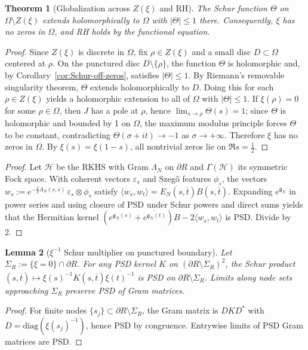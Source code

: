 \documentclass[11pt]{article}
\newtheorem{theorem}{Theorem}
\newtheorem{lemma}[theorem]{Lemma}
\theoremstyle{remark}
\begin{document}
\begin{theorem}[Globalization across \(Z(\xi)\) and RH]\label{thm:globalize-RH}
The Schur function \(\Theta\) on \(\Omega\setminus Z(\xi)\) extends holomorphically to \(\Omega\) with \(|\Theta|\le 1\) there. Consequently, \(\xi\) has no zeros in \(\Omega\), and RH holds by the functional equation.
\end{theorem}
\begin{proof}
Since \(Z(\xi)\) is discrete in \(\Omega\), fix \(\rho\in Z(\xi)\) and a small disc \(D\subset\Omega\) centered at \(\rho\). On the punctured disc \(D\setminus\{\rho\}\), the function \(\Theta\) is holomorphic and, by Corollary~\ref{cor:Schur-off-zeros}, satisfies \(|\Theta|\le 1\). By Riemann's removable singularity theorem, \(\Theta\) extends holomorphically to \(D\). Doing this for each \(\rho\in Z(\xi)\) yields a holomorphic extension to all of \(\Omega\) with \(|\Theta|\le 1\). If \(\xi(\rho)=0\) for some \(\rho\in\Omega\), then \(J\) has a pole at \(\rho\), hence \(\lim_{s\to\rho}\Theta(s)=1\); since \(\Theta\) is holomorphic and bounded by 1 on \(\Omega\), the maximum modulus principle forces \(\Theta\) to be constant, contradicting \(\Theta(\sigma+it)\to -1\) as \(\sigma\to+\infty\). Therefore \(\xi\) has no zeros in \(\Omega\). By \(\xi(s)=\xi(1-s)\), all nontrivial zeros lie on \(\Re s=\tfrac12\).
\end{proof}
\begin{proof}
Let \(\mathcal H\) be the RKHS with Gram \(\Lambda_N\) on \(\partial R\) and \(\Gamma(\mathcal H)\) its symmetric Fock space. With coherent vectors \(\varepsilon_s\) and Szeg\H{o} features \(\phi_s\), the vectors \(w_s:=e^{-\frac12\Lambda_N(s,\overline s)}\,\varepsilon_s\otimes\phi_s\) satisfy \(\langle w_s,w_t\rangle=E_N(s,\overline t)B(s,\overline t)\). Expanding \(e^{\mathfrak g_N}\) in power series and using closure of PSD under Schur powers and direct sums yields that the Hermitian kernel \((e^{\mathfrak g_N(s)}+\overline{e^{\mathfrak g_N(t)}})B-2\langle w_s,w_t\rangle\) is PSD. Divide by 2.
\end{proof}

\begin{lemma}[\(\xi^{-1}\) Schur multiplier on punctured boundary]\label{lem:schur-punctured}
Let \(\Sigma_R:=\{\xi=0\}\cap\partial R\). For any PSD kernel \(K\) on \((\partial R\setminus\Sigma_R)^2\), the Schur product \( (s,\overline t)\mapsto \xi(s)^{-1}K(s,\overline t)\overline{\xi(t)^{-1}}\) is PSD on \(\partial R\setminus\Sigma_R\). Limits along node sets approaching \(\Sigma_R\) preserve PSD of Gram matrices.
\end{lemma}
\begin{proof}
For finite nodes \(\{s_j\}\subset\partial R\setminus\Sigma_R\), the Gram matrix is \(D K D^*\) with \(D=\mathrm{diag}(\xi(s_j)^{-1})\), hence PSD by congruence. Entrywise limits of PSD Gram matrices are PSD.
\end{proof}
\end{document}
